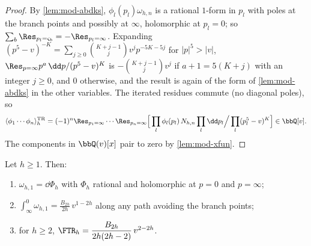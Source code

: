 \begin{proof}
By \cref{lem:mod-abdks}, $\phi_l(p_l)\omega_{h,n}$ is a rational $1$-form in $p_l$ with poles at the branch points and possibly at $\infty$, holomorphic at $p_l=0$; so $\sum_b\Res_{p_l=\varsigma_b}=-\Res_{p_l=\infty}$. Expanding $(p^5-v)^{-K}=\sum_{j\geq 0}\binom{K+j-1}{j}v^jp^{-5K-5j}$ for $|p|^5>|v|$, $\Res_{p=\infty}p^a\,\dd p/(p^5-v)^K$ is $-\binom{K+j-1}{j}v^j$ if $a+1=5(K+j)$ with an integer $j\geq 0$, and $0$ otherwise, and the result is again of the form of \cref{lem:mod-abdks} in the other variables. The iterated residues commute (no diagonal poles), so
\[
\langle\phi_1\cdots\phi_n\rangle^{\mathrm{TR}}_h=(-1)^n\Res_{p_1=\infty}\cdots\Res_{p_n=\infty}\Big[\prod_l\phi_l(p_l)\,N_{h,n}\prod_l\dd p_l\Big/\prod_l(p_l^5-v)^K\Big]\in\bbQ[v].
\] The components in $\bbQ(v)[x]$ pair to zero by \cref{lem:mod-xfun}.
\end{proof}

\begin{prop}
\label{prop:mod-period}
Let $h\geq 1$. Then:
\begin{enumerate}
\item $\omega_{h,1}=\dd\Phi_h$ with $\Phi_h$ rational and holomorphic at $p=0$ and $p=\infty$;
\item $\int_\infty^0\omega_{h,1}=\frac{B_{2h}}{2h}\,v^{1-2h}$ along any path avoiding the branch points;
\item for $h\geq 2$, $\FTR_h=\dfrac{B_{2h}}{2h(2h-2)}\,v^{2-2h}$.
\end{enumerate}
\end{prop}

